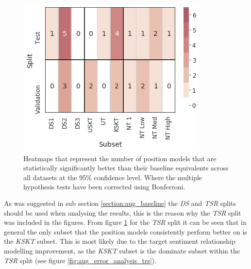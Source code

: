 \begin{figure}[h!]
    \centering
    \includegraphics[scale=0.6]{images/augmentation/methods_performance/Position_Encoding/position_combined_subset_heatmap.png}
    \caption{Heatmaps that represent the number of position models that are statistically significantly better than their baseline equivalents across all datasets at the 95\% confidence level. Where the multiple hypothesis tests have been corrected using Bonferroni.}
    \label{fig:aug_position_combined_subset_heatmap}
\end{figure}

As was suggested in sub section \ref{section:aug_baseline} the \textit{DS} and \textit{TSR} splits should be used when analysing the results, this is the reason why the \textit{TSR} split was included in the figures. From figure \ref{fig:aug_position_combined_subset_heatmap} for the \textit{TSR} split it can be seen that in general the only subset that the position models consistently perform better on is the \textit{KSKT} subset. This is most likely due to the target sentiment relationship modelling improvement, as the \textit{KSKT} subset is the dominate subset within the \textit{TSR} split (see figure \ref{fig:aug_error_analysis_trs}).

